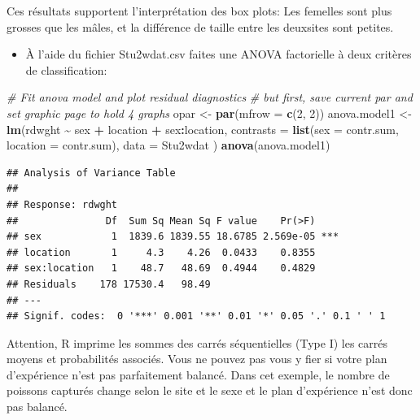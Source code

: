 \documentclass[
  12pt,
]{book}
\makeatletter
\newenvironment{Shaded}{\begin{snugshade}}{\end{snugshade}}
\newcommand{\CommentTok}[1]{\textcolor[rgb]{0.56,0.35,0.01}{\textit{#1}}}
\newcommand{\DataTypeTok}[1]{\textcolor[rgb]{0.13,0.29,0.53}{#1}}
\newcommand{\DecValTok}[1]{\textcolor[rgb]{0.00,0.00,0.81}{#1}}
\newcommand{\KeywordTok}[1]{\textcolor[rgb]{0.13,0.29,0.53}{\textbf{#1}}}
\newcommand{\NormalTok}[1]{#1}
\newcommand{\OperatorTok}[1]{\textcolor[rgb]{0.81,0.36,0.00}{\textbf{#1}}}
\newcommand{\StringTok}[1]{\textcolor[rgb]{0.31,0.60,0.02}{#1}}
\providecommand{\tightlist}{%
  \setlength{\itemsep}{0pt}\setlength{\parskip}{0pt}}
\newenvironment{kframe}{%
\medskip{}
\setlength{\fboxsep}{.8em}
\def\at@end@of@kframe{}%
\ifinner\ifhmode%
 \def\at@end@of@kframe{\end{minipage}}%
 \begin{minipage}{\columnwidth}%
\fi\fi%
\def\FrameCommand##1{\hskip\@totalleftmargin \hskip-\fboxsep
\colorbox{incolor}{##1}\hskip-\fboxsep
    \hskip-\linewidth \hskip-\@totalleftmargin \hskip\columnwidth}%
\MakeFramed {\advance\hsize-\width
  \@totalleftmargin\z@ \linewidth\hsize
  \@setminipage}}%
{\par\unskip\endMakeFramed%
\at@end@of@kframe}
\newenvironment{rmdblock}[1]
 {
 \begin{itemize}
 \renewcommand{\labelitemi}{
   \raisebox{-.7\height}[0pt][0pt]{
     {\setkeys{Gin}{width=3em,keepaspectratio}\texttt{[image: images/\#1]}}
   }
 }
 \begin{kframe}
 \setlength{\fboxsep}{1em}
 \item
 }
 {
 \end{kframe}
 \end{itemize}
 }
\newenvironment{rmdwarning}
  {\begin{rmdblock}{warning}}
  {\end{rmdblock}}
\makeatother
\begin{document}
Ces résultats supportent l'interprétation des box plots: Les femelles sont plus grosses que les mâles, et la différence de taille entre les deuxsites sont petites.

\begin{itemize}
\tightlist
\item
  À l'aide du fichier Stu2wdat.csv faites une ANOVA factorielle à
  deux critères de classification:
\end{itemize}

\begin{Shaded}
\begin{Highlighting}[]
\CommentTok{\# Fit anova model and plot residual diagnostics}
\CommentTok{\# but first, save current par and set graphic page to hold 4 graphs}
\NormalTok{opar \textless{}{-}}\StringTok{ }\KeywordTok{par}\NormalTok{(}\DataTypeTok{mfrow =} \KeywordTok{c}\NormalTok{(}\DecValTok{2}\NormalTok{, }\DecValTok{2}\NormalTok{))}
\NormalTok{anova.model1 \textless{}{-}}\StringTok{ }\KeywordTok{lm}\NormalTok{(rdwght }\OperatorTok{\textasciitilde{}}\StringTok{ }\NormalTok{sex }\OperatorTok{+}\StringTok{ }\NormalTok{location }\OperatorTok{+}\StringTok{ }\NormalTok{sex}\OperatorTok{:}\NormalTok{location,}
  \DataTypeTok{contrasts =} \KeywordTok{list}\NormalTok{(}\DataTypeTok{sex =}\NormalTok{ contr.sum, }\DataTypeTok{location =}\NormalTok{ contr.sum),}
  \DataTypeTok{data =}\NormalTok{ Stu2wdat}
\NormalTok{)}
\KeywordTok{anova}\NormalTok{(anova.model1)}
\end{Highlighting}
\end{Shaded}

\begin{verbatim}
## Analysis of Variance Table
## 
## Response: rdwght
##               Df  Sum Sq Mean Sq F value    Pr(>F)    
## sex            1  1839.6 1839.55 18.6785 2.569e-05 ***
## location       1     4.3    4.26  0.0433    0.8355    
## sex:location   1    48.7   48.69  0.4944    0.4829    
## Residuals    178 17530.4   98.49                      
## ---
## Signif. codes:  0 '***' 0.001 '**' 0.01 '*' 0.05 '.' 0.1 ' ' 1
\end{verbatim}

\begin{rmdwarning}
Attention, R imprime les sommes des carrés séquentielles (Type I) les carrés moyens et probabilités associés. Vous ne pouvez pas vous y fier si votre plan d'expérience n'est pas parfaitement balancé. Dans cet exemple, le nombre de poissons capturés change selon le site et le sexe et le plan d'expérience n'est donc pas balancé.
\end{rmdwarning}
\end{document}
